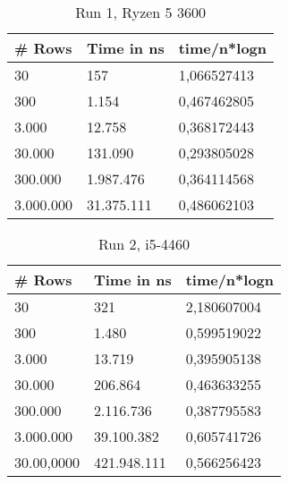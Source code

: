 \begin{table}[!ht]
    \centering
    \begin{tabular}{|l|l|l|}
    \hline
        \# Rows & Time in ns & time/n*logn \\ \hline
        30 & 157 & 1,066527413 \\ \hline
        300 & 1.154 & 0,467462805 \\ \hline
        3.000 & 12.758 & 0,368172443 \\ \hline
        30.000 & 131.090 & 0,293805028 \\ \hline
        300.000 & 1.987.476 & 0,364114568 \\ \hline
        3.000.000 & 31.375.111 & 0,486062103 \\ \hline
    \end{tabular}
    \caption{Run 1, Ryzen 5 3600}
\end{table}

\begin{table}[!ht]
    \centering
    \begin{tabular}{|l|l|l|}
    \hline
        \# Rows & Time in ns & time/n*logn \\ \hline
        30 & 321 & 2,180607004 \\ \hline
        300 & 1.480 & 0,599519022 \\ \hline
        3.000 & 13.719 & 0,395905138 \\ \hline
        30.000 & 206.864 & 0,463633255 \\ \hline
        300.000 & 2.116.736 & 0,387795583 \\ \hline
        3.000.000 & 39.100.382 & 0,605741726 \\ \hline
        30.00,0000 & 421.948.111 & 0,566256423 \\ \hline
    \end{tabular}
    \caption{Run 2, i5-4460}
\end{table}